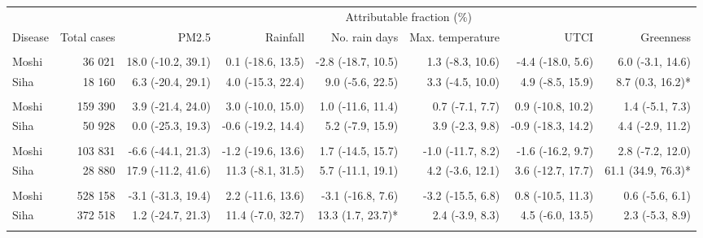 \begin{table}[t]
\fontsize{12.0pt}{14.4pt}\selectfont
\begin{tabular*}{\linewidth}{@{\extracolsep{\fill}}l|rrrrrrr}
\toprule
 &  & \multicolumn{6}{c}{Attributable fraction (\%)} \\ 
\cmidrule(lr){3-8}
Disease & Total cases & PM2.5 & Rainfall & No. rain days & Max. temperature & UTCI & Greenness \\ 
\midrule\addlinespace[2.5pt]
\multicolumn{8}{l}{Chronic Respiratory Disease} \\[2.5pt] 
\midrule\addlinespace[2.5pt]
Moshi & 36 021 & 18.0 (-10.2, 39.1)  & 0.1 (-18.6, 13.5)  & -2.8 (-18.7, 10.5)  & 1.3 (-8.3, 10.6)  & -4.4 (-18.0, 5.6)  & 6.0 (-3.1, 14.6)  \\ 
Siha & 18 160 & 6.3 (-20.4, 29.1)  & 4.0 (-15.3, 22.4)  & 9.0 (-5.6, 22.5)  & 3.3 (-4.5, 10.0)  & 4.9 (-8.5, 15.9)  & 8.7 (0.3, 16.2)* \\ 
\midrule\addlinespace[2.5pt]
\multicolumn{8}{l}{Hypertension} \\[2.5pt] 
\midrule\addlinespace[2.5pt]
Moshi & 159 390 & 3.9 (-21.4, 24.0)  & 3.0 (-10.0, 15.0)  & 1.0 (-11.6, 11.4)  & 0.7 (-7.1, 7.7)  & 0.9 (-10.8, 10.2)  & 1.4 (-5.1, 7.3)  \\ 
Siha & 50 928 & 0.0 (-25.3, 19.3)  & -0.6 (-19.2, 14.4)  & 5.2 (-7.9, 15.9)  & 3.9 (-2.3, 9.8)  & -0.9 (-18.3, 14.2)  & 4.4 (-2.9, 11.2)  \\ 
\midrule\addlinespace[2.5pt]
\multicolumn{8}{l}{Diabetes Mellitus} \\[2.5pt] 
\midrule\addlinespace[2.5pt]
Moshi & 103 831 & -6.6 (-44.1, 21.3)  & -1.2 (-19.6, 13.6)  & 1.7 (-14.5, 15.7)  & -1.0 (-11.7, 8.2)  & -1.6 (-16.2, 9.7)  & 2.8 (-7.2, 12.0)  \\ 
Siha & 28 880 & 17.9 (-11.2, 41.6)  & 11.3 (-8.1, 31.5)  & 5.7 (-11.1, 19.1)  & 4.2 (-3.6, 12.1)  & 3.6 (-12.7, 17.7)  & 61.1 (34.9, 76.3)* \\ 
\midrule\addlinespace[2.5pt]
\multicolumn{8}{l}{Upper Respiratory Infections} \\[2.5pt] 
\midrule\addlinespace[2.5pt]
Moshi & 528 158 & -3.1 (-31.3, 19.4)  & 2.2 (-11.6, 13.6)  & -3.1 (-16.8, 7.6)  & -3.2 (-15.5, 6.8)  & 0.8 (-10.5, 11.3)  & 0.6 (-5.6, 6.1)  \\ 
Siha & 372 518 & 1.2 (-24.7, 21.3)  & 11.4 (-7.0, 32.7)  & 13.3 (1.7, 23.7)* & 2.4 (-3.9, 8.3)  & 4.5 (-6.0, 13.5)  & 2.3 (-5.3, 8.9)  \\ 
\midrule\addlinespace[2.5pt]
\multicolumn{8}{l}{Diarrhea} \\[2.5pt] 

\end{tabular*}
\end{table}
